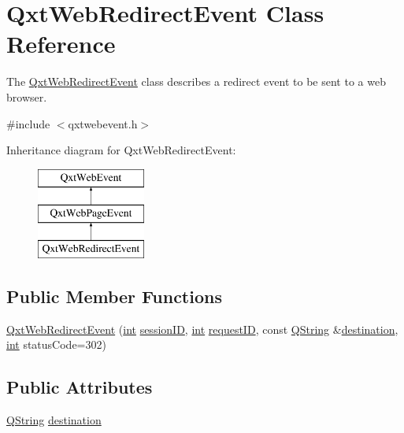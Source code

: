 \hypertarget{class_qxt_web_redirect_event}{\section{Qxt\-Web\-Redirect\-Event Class Reference}
\label{class_qxt_web_redirect_event}
}


The \hyperlink{class_qxt_web_redirect_event}{Qxt\-Web\-Redirect\-Event} class describes a redirect event to be sent to a web browser.  




{\ttfamily \#include $<$qxtwebevent.\-h$>$}

Inheritance diagram for Qxt\-Web\-Redirect\-Event\-:\begin{figure}[H]
\begin{center}
\leavevmode
\includegraphics[height=3.000000cm]{class_qxt_web_redirect_event}
\end{center}
\end{figure}
\subsection*{Public Member Functions}
\begin{DoxyCompactItemize}
\item 
\hyperlink{class_qxt_web_redirect_event_ad7d749adaa8d56bf7b6c48e7ca752809}{Qxt\-Web\-Redirect\-Event} (\hyperlink{ioapi_8h_a787fa3cf048117ba7123753c1e74fcd6}{int} \hyperlink{class_qxt_web_event_a3fdb1d80c46e535c2c79a06269a5d307}{session\-I\-D}, \hyperlink{ioapi_8h_a787fa3cf048117ba7123753c1e74fcd6}{int} \hyperlink{class_qxt_web_page_event_a144c8010cc1c9d239bf5de4c72d09f7a}{request\-I\-D}, const \hyperlink{group___u_a_v_objects_plugin_gab9d252f49c333c94a72f97ce3105a32d}{Q\-String} \&\hyperlink{class_qxt_web_redirect_event_a90be909646cd7df01a88058cdb3cbb8a}{destination}, \hyperlink{ioapi_8h_a787fa3cf048117ba7123753c1e74fcd6}{int} status\-Code=302)
\end{DoxyCompactItemize}
\subsection*{Public Attributes}
\begin{DoxyCompactItemize}
\item 
\hyperlink{group___u_a_v_objects_plugin_gab9d252f49c333c94a72f97ce3105a32d}{Q\-String} \hyperlink{class_qxt_web_redirect_event_a90be909646cd7df01a88058cdb3cbb8a}{destination}
\end{DoxyCompactItemize}
